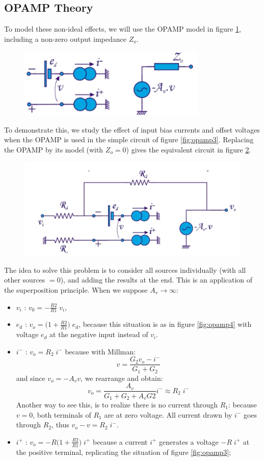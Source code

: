 \subsection{OPAMP Theory}
To model these non-ideal effects, we will use the OPAMP model in figure \ref{fig:opamp6}, including a non-zero output impedance $Z_o$.
\begin{figure}[h!]
	\centering
	\includegraphics[width=9cm]{figures/ch02/opamp6.jpg}
	\caption{}
	\label{fig:opamp6}
\end{figure}
To demonstrate this, we study the effect of input bias currents and offset voltages when the OPAMP is used in the simple circuit of figure \ref{fig:opamp3}. Replacing the OPAMP by its model (with $Z_o = 0$) gives the equivalent circuit in figure \ref{fig:opamp7}.
\begin{figure}[h!]
	\centering
	\includegraphics[width=12cm]{figures/ch02/opamp8.jpg}
	\caption{}
	\label{fig:opamp7}
\end{figure}
The idea to solve this problem is to consider all sources individually (with all other sources $=0$), and adding the results at the end. This is an application of the superposition principle. When we suppose $A_v \rightarrow \infty$:
\begin{itemize}
	\item $v_i$ : $v_0 = -\frac{R2}{R1} \; v_i$,
	\item $e_d$ : $v_o = \big(1 + \frac{R2}{R1} \big) \; e_d$, because this situation is as in figure \ref{fig:opamp4} with voltage $e_d$ at the negative input instead of $v_i$.
	\item $i^-$ : $v_o = R_2 \; i^-$ because with Millman:
	$$
	v = \frac{G_2 v_o - i^-}{G_1 + G_2}
	$$
	and since $v_o = -A_v v$, we rearrange and obtain:
	$$
	v_o = \frac{A_v}{G_1 + G_2 + A_v G2} i^- \approx R_2 \; i^-
	$$
	Another way to see this, is to realize there is no current through $R_1$: because $v=0$, both terminals of $R_1$ are at zero voltage. All current drawn by $i^-$ goes through $R_2$, thus $v_o - v = R_2 \; i^-$.
	\item $i^+$ : $v_o = -R \big(1 + \frac{R2}{R1} \big) \; i^+$ because a current $i^+$ generates a voltage $-R \; i^+$ at the positive terminal, replicating the situation of figure \ref{fig:opamp3};
\end{itemize}
